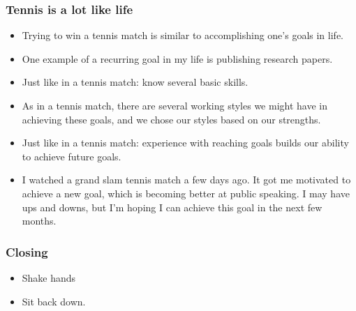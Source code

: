 \begin{frame} 
\frametitle{Tennis is a lot like life} 
\begin{itemize}  
\item \small Trying to win a tennis match is similar to accomplishing one's goals in life.
\item \small One example of a recurring goal in my life is publishing research papers.   
\item \small Just like in a tennis match: know several basic skills. 

\item \small As in a tennis match, there are several working styles we might have in achieving these goals, and we chose our styles based on our strengths. 
\item \small Just like in a tennis match: experience with reaching goals
builds our ability to achieve future goals. 

\item \small I watched a grand slam tennis match a few days ago. It got me motivated to achieve 
a new goal, which is becoming better at public speaking. I may have ups and downs, but 
I'm hoping I can achieve this goal in the next few months. 
\end{itemize} 
\end{frame}

\begin{frame}
\frametitle{Closing}
\begin{itemize}
\item Shake hands 
\item Sit back down.
\end{itemize}
\end{frame} 

